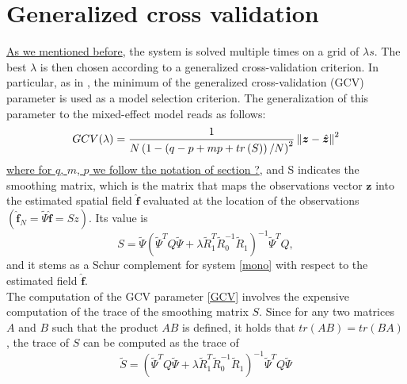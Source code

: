 \section{Generalized cross validation}
\underline{As we mentioned before}, the system is solved multiple times on a grid of $\lambda s$. The best $\lambda$ is then chosen according
to a generalized cross-validation criterion. In particular, as in \cite{sangalli1}, the minimum of the generalized cross-validation (GCV) parameter is used as a model selection criterion. The generalization of this parameter to the mixed-effect model reads as follows:
\begin{equation}
	\label{GCV}
	GCV(\lambda) = \frac{1}{N\left(1-\left(q-p+mp+tr\left(S\right)\right)/N\right)^2}\left\|\bm{z} - \hat{\bm{z}}\right\|^2
\end{equation}
\underline{where for $q$, $m$, $p$ we follow the notation of section
	?}, and S indicates the smoothing matrix, which is the matrix that maps the
observations vector $\bm{z}$ into the estimated spatial field $\hat{\bm{f}}$
evaluated at the location of the observations $(\hat{\bm{f}}_N =
	\tilde{\Psi}\hat{\bm{f}} = S z)$. Its value is
\begin{equation}
	S = \tilde{\Psi} \left(\tilde{\Psi}^TQ\tilde{\Psi} + \lambda \tilde{R}_1^T
	\tilde{R}_0^{-1} \tilde{R}_1\right)^{-1}\tilde{\Psi}^TQ,
\end{equation}
and it stems as a Schur complement for system \ref{mono} with respect
to the estimated field $\hat{\bm{f}}$.\\ The computation of the GCV parameter
\ref{GCV} involves the expensive computation of the trace of the smoothing
matrix $S$. Since for any two matrices $A$ and $B$ such that the product $AB$
is defined, it holds that $tr\left(AB\right) = tr\left(BA\right)$, the trace of
$S$ can be computed as the trace of
\begin{equation}
	\tilde{S} = \left(\tilde{\Psi}^TQ\tilde{\Psi} + \lambda \tilde{R}_1^T
	\tilde{R}_0^{-1} \tilde{R}_1\right)^{-1}\tilde{\Psi}^TQ \tilde{\Psi}
\end{equation}

